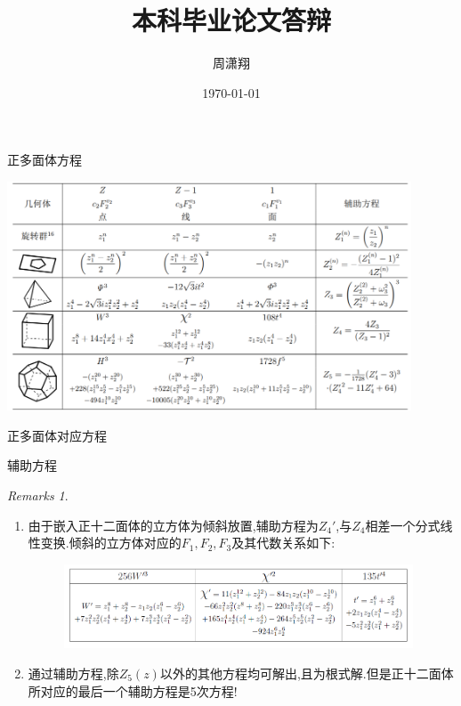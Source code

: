 \documentclass[pdf]{beamer}
\title{本科毕业论文答辩}
\author{周潇翔}
\institute[USTC]{University of Science and Technology of China}
\date{\today}
\numberwithin{equation}{section}
\theoremstyle{plain}
\theoremstyle{plain}
\theoremstyle{remark}
\newtheorem{remarks}{Remarks}
\begin{document}
\begin{frame}{正多面体方程}
	\begin{table}[ht]
	\centering
	\includegraphics[width=0.9\textwidth]{snip/eqpoly.png}
	\caption{正多面体对应方程}
	\label{tb:equations}
\end{table}
\end{frame}

\begin{frame}{辅助方程}
	\begin{remarks}\
		\begin{enumerate}[1.]
			\item 由于嵌入正十二面体的立方体为倾斜放置,辅助方程为$Z_4'$,与$Z_4$相差一个分式线性变换.倾斜的立方体对应的$F_1,F_2,F_3$及其代数关系如下:
			\begin{figure}[ht]
				\centering
				\hspace{-1cm}
				\includegraphics[width=0.98\textwidth]{snip/slantpoly.png}
			\end{figure}
			\item 通过辅助方程,除$Z_5(z)$以外的其他方程均可解出,且为根式解.但是正十二面体所对应的最后一个辅助方程是5次方程!
		\end{enumerate}
	\end{remarks}
\end{frame}

\end{document}
